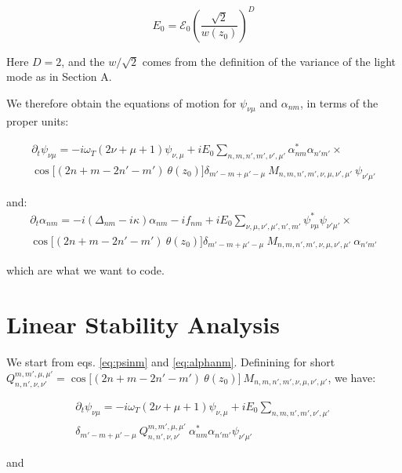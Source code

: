 \documentclass[a4paper,twocolumn,nobalancelastpage]{revtex4-1}
\newcommand{\af}{\psi_{\nu\mu}}
\newcommand{\lf}{\alpha_{nm}}
\newcommand{\lfp}{\alpha_{n'm'}}
\begin{document}
\begin{equation}
E_0=\mathcal{E}_0 \left(\frac{\sqrt{2}}{w(z_0)} \right)^D
\end{equation}

Here $D=2$, and the $w/\sqrt{2}$ comes from the definition of the variance of the light mode as in Section A.

We therefore obtain the equations of motion for $\af$ and $\lf$, in terms of the proper units:

\begin{widetext}

\begin{multline}
\label{eq:psinm}
\partial_t \psi_{\nu \mu} = -i\omega_T (2\nu+\mu+1) \psi_{\nu, \mu}
+i E_0 \sum_{n,m,n',m', \nu', \mu'} \lf^* \lfp \times \\ 
\cos \big[(2n+m-  2n'-m') \ \theta(z_0)\big] 
\delta_{m'-m+\mu'-\mu} \ M_{n,m,n',m',\nu,\mu,\nu',\mu'} \ \psi_{\nu'\mu'} 
\end{multline}

and:
\begin{multline}
\label{eq:alphanm}
\partial_t \alpha_{nm}= -i(\Delta_{nm}-i\kappa) \alpha_{nm}-if_{nm} +i E_0 \sum_{\nu, \mu,\nu', \mu',n',m'} \psi_{\nu\mu}^* \psi_{\nu'\mu'} \times \\     
\cos \big[(2n+m-  2n'-m') \ \theta(z_0)\big]  \delta_{m'-m+\mu'-\mu} \ 
M_{n,m,n',m',\nu,\mu,\nu',\mu'} \ \alpha_{n'm'} 
\end{multline}

\end{widetext}

which are what we want to code.

\section{Linear Stability Analysis}

We start from eqs. \eqref{eq:psinm} and \eqref{eq:alphanm}. Definining for short $Q^{m,m',\mu,\mu'}_{n,n',\nu,\nu'}=\cos \big[(2n+m-  2n'-m')\ \theta(z_0)\big]  \ M_{n,m,n',m',\nu,\mu,\nu',\mu'}$, we have:

\begin{multline}
\partial_t \psi_{\nu \mu} = -i\omega_T (2\nu+\mu+1) \psi_{\nu, \mu}
+i E_0 \sum_{n,m,n',m', \nu', \mu'} \\
\delta_{m'-m+\mu'-\mu} \ Q^{m,m',\mu,\mu'}_{n,n',\nu,\nu'} \ \lf^* \lfp  \psi_{\nu'\mu'} 
\end{multline}

and
\end{document}
